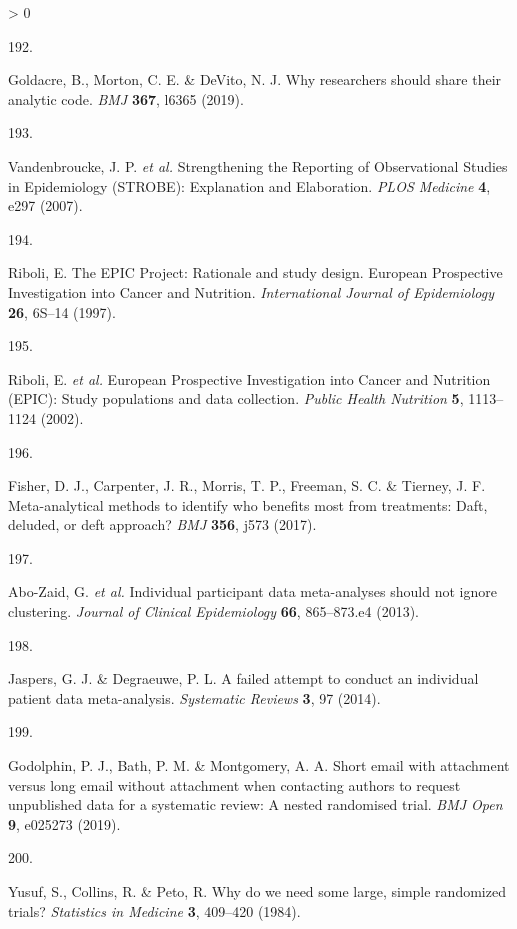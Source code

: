 \documentclass[a4paper, twoside]{templates/ociamthesis}
\newlength{\cslhangindent}
\newlength{\csllabelwidth}
\newenvironment{CSLReferences}[3] %
 {%
  \setlength{\parindent}{0pt}
  \ifodd #1 \everypar{\setlength{\hangindent}{\cslhangindent}}\ignorespaces\fi
  \ifnum #2 > 0
  \setlength{\parskip}{#2\baselineskip}
  \fi
 }%
 {}
\newcommand{\CSLLeftMargin}[1]{\parbox[t]{\maxof{\widthof{#1}}{\csllabelwidth}}{#1}}
\newcommand{\CSLRightInline}[1]{\parbox[t]{\linewidth - \csllabelwidth}{#1}}
\begin{document}
\begin{CSLReferences}{0}{0}
\leavevmode\hypertarget{ref-goldacre2019c}{}%
\CSLLeftMargin{192. }
\CSLRightInline{Goldacre, B., Morton, C. E. \& DeVito, N. J. Why researchers should share their analytic code. \emph{BMJ} \textbf{367}, l6365 (2019).}

\leavevmode\hypertarget{ref-vandenbroucke2007}{}%
\CSLLeftMargin{193. }
\CSLRightInline{Vandenbroucke, J. P. \emph{et al.} Strengthening the {Reporting} of {Observational Studies} in {Epidemiology} ({STROBE}): {Explanation} and {Elaboration}. \emph{PLOS Medicine} \textbf{4}, e297 (2007).}

\leavevmode\hypertarget{ref-riboli1997}{}%
\CSLLeftMargin{194. }
\CSLRightInline{Riboli, E. The {EPIC Project}: Rationale and study design. {European Prospective Investigation} into {Cancer} and {Nutrition}. \emph{International Journal of Epidemiology} \textbf{26}, 6S--14 (1997).}

\leavevmode\hypertarget{ref-riboli2002}{}%
\CSLLeftMargin{195. }
\CSLRightInline{Riboli, E. \emph{et al.} European {Prospective Investigation} into {Cancer} and {Nutrition} ({EPIC}): Study populations and data collection. \emph{Public Health Nutrition} \textbf{5}, 1113--1124 (2002).}

\leavevmode\hypertarget{ref-fisher2017}{}%
\CSLLeftMargin{196. }
\CSLRightInline{Fisher, D. J., Carpenter, J. R., Morris, T. P., Freeman, S. C. \& Tierney, J. F. Meta-analytical methods to identify who benefits most from treatments: Daft, deluded, or deft approach? \emph{BMJ} \textbf{356}, j573 (2017).}

\leavevmode\hypertarget{ref-abo-zaid2013}{}%
\CSLLeftMargin{197. }
\CSLRightInline{Abo-Zaid, G. \emph{et al.} Individual participant data meta-analyses should not ignore clustering. \emph{Journal of Clinical Epidemiology} \textbf{66}, 865--873.e4 (2013).}

\leavevmode\hypertarget{ref-jaspers2014}{}%
\CSLLeftMargin{198. }
\CSLRightInline{Jaspers, G. J. \& Degraeuwe, P. L. A failed attempt to conduct an individual patient data meta-analysis. \emph{Systematic Reviews} \textbf{3}, 97 (2014).}

\leavevmode\hypertarget{ref-godolphin2019a}{}%
\CSLLeftMargin{199. }
\CSLRightInline{Godolphin, P. J., Bath, P. M. \& Montgomery, A. A. Short email with attachment versus long email without attachment when contacting authors to request unpublished data for a systematic review: A nested randomised trial. \emph{BMJ Open} \textbf{9}, e025273 (2019).}

\leavevmode\hypertarget{ref-yusuf1984}{}%
\CSLLeftMargin{200. }
\CSLRightInline{Yusuf, S., Collins, R. \& Peto, R. Why do we need some large, simple randomized trials? \emph{Statistics in Medicine} \textbf{3}, 409--420 (1984).}


\end{CSLReferences}
\end{document}
